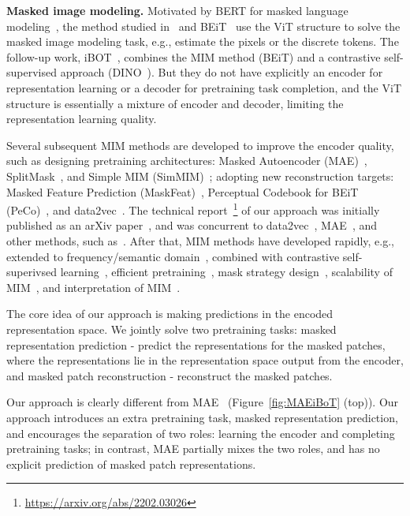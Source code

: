 \documentclass[twocolumn]{svjour3}          \smartqed  \usepackage{graphicx}
\begin{document}
\vspace{1mm}
\noindent\textbf{Masked image modeling.}
Motivated by BERT for masked language modeling~\cite{DevlinCLT19}, 
the method studied in~\cite{DosovitskiyB0WZ21} and BEiT~\cite{bao2021beit} use the ViT structure
to solve the masked image modeling task,
e.g., estimate the pixels
or the discrete tokens.
The follow-up work, iBOT~\cite{zhou2021ibot},
combines the MIM method (BEiT) and 
a contrastive self-supervised approach (DINO~\cite{CaronTMJMBJ21}).
But they do not have explicitly an encoder 
for representation learning 
or a decoder for pretraining task completion,
and the ViT structure is essentially a mixture of encoder and decoder,
limiting the representation learning quality.

 
Several subsequent MIM methods
are developed to improve the encoder quality, 
such as designing pretraining architectures:
Masked Autoencoder (MAE)~\cite{he2021masked},
SplitMask~\cite{el2021large},
and Simple MIM (SimMIM)~\cite{xie2021simmim};
adopting new reconstruction targets: 
Masked Feature Prediction (MaskFeat)~\cite{wei2021masked},
Perceptual Codebook for BEiT (PeCo)~\cite{dong2021peco},
and
data2vec~\cite{BaevskiHXBGA22}.
The technical report~\footnote{\url{https://arxiv.org/abs/2202.03026}} of our approach
was initially published as an arXiv paper~\cite{CAE2022},
and was concurrent to data2vec~\cite{BaevskiHXBGA22}, MAE~\cite{he2021masked},
and other methods, such as~\cite{el2021large,xie2021simmim}.
After that, MIM methods have developed rapidly,
e.g., extended to frequency/semantic domain~\cite{xie2022masked,liu2022devil,wei2022mvp,li2022mc},  
combined with contrastive self-superivsed learning~\cite{tao2022siamese,jing2022masked,yi2022masked,huang2022contrastive}, 
efficient pretraining~\cite{zhang2022hivit,huang2022green,chen2022efficient}, 
mask strategy design~\cite{kakogeorgiou2022hide,li2022semmae,li2022uniform},
scalability of MIM~\cite{xie2022data},
and interpretation of MIM~\cite{xie2022revealing,li2022architecture,kong2022understanding}.



The core idea of our approach 
is making predictions in the encoded representation space.
We jointly solve two pretraining tasks:
masked representation prediction - predict the representations for the masked patches, 
where the representations lie in the representation space output from the encoder,
and masked patch reconstruction - reconstruct the masked patches.

Our approach is clearly different from MAE~\cite{he2021masked} (Figure~\ref{fig:MAEiBoT} (top)).
Our approach introduces an extra pretraining task, masked representation prediction,
and encourages the separation 
of two roles: learning the encoder and completing pretraining tasks;
in contrast,
MAE partially mixes the two roles,
and has no explicit prediction of masked patch representations.
\end{document}
